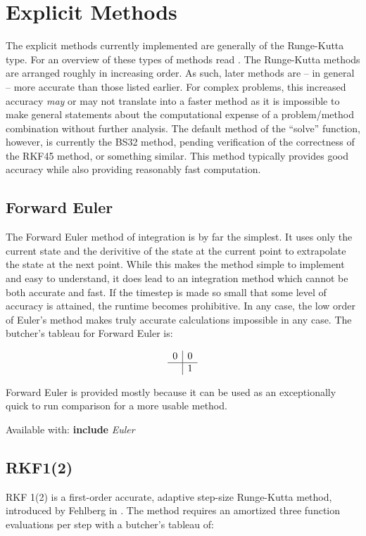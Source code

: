 \documentclass[letterpaper,10pt]{book}
\newcommand{\srcas}[1]{Available with: \textbf{include} \textlangle{}\textit{#1}\textrangle{}}
\begin{document}
    \section{Explicit Methods}
      The explicit methods currently implemented are generally of the Runge-Kutta type.  For an overview of these types of methods read \cite{butcher1996history}.  The Runge-Kutta methods are arranged roughly in increasing order.  As such, later methods are -- in general -- more accurate than those listed earlier.  For complex problems, this increased accuracy \textit{may} or may not translate into a faster method as it is impossible to make general statements about the computational expense of a problem/method combination without further analysis.  The default method of the ``solve'' function, however, is currently the BS32 method, pending verification of the correctness of the RKF45 method, or something similar.  This method typically provides good accuracy while also providing reasonably fast computation.
      
      \subsection{Forward Euler}   
	The Forward Euler method of integration is by far the simplest.  It uses only the current state and the derivitive of the state at the current point to extrapolate the state at the next point.  While this makes the method simple to implement and easy to understand, it does lead to an integration method which cannot be both accurate and fast.  If the timestep is made so small that some level of accuracy is attained, the runtime becomes prohibitive.  In any case, the low order of Euler's method makes truly accurate calculations impossible in any case.  The butcher's tableau for Forward Euler is:
	
	\[
	  \begin{array}{c|c}
	    0 & 0\\
	    \hline
	    & 1
	  \end{array}
	\]
	
	Forward Euler is provided mostly because it can be used as an exceptionally quick to run comparison for a more usable method.
	
	\srcas{Euler}
	
      \subsection{RKF1(2)}
	RKF 1(2) is a first-order accurate, adaptive step-size Runge-Kutta method, introduced by Fehlberg in \cite{fehlberg1969low}.  The method requires an amortized three function evaluations per step with a butcher's tableau of:
	
\end{document}
